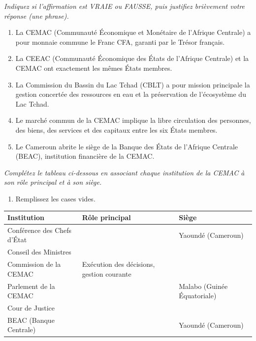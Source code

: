 \documentclass[11pt]{article}
\begin{document}
\begin{exercice}
\emph{Indiquez si l'affirmation est VRAIE ou FAUSSE, puis justifiez brièvement votre réponse (une phrase).}
\begin{enumerate}
    \item La CEMAC (Communauté Économique et Monétaire de l'Afrique Centrale) a pour monnaie commune le Franc CFA, garanti par le Trésor français.
    \item La CEEAC (Communauté Économique des États de l'Afrique Centrale) et la CEMAC ont exactement les mêmes États membres.
    \item La Commission du Bassin du Lac Tchad (CBLT) a pour mission principale la gestion concertée des ressources en eau et la préservation de l'écosystème du Lac Tchad.
    \item Le marché commun de la CEMAC implique la libre circulation des personnes, des biens, des services et des capitaux entre les six États membres.
    \item Le Cameroun abrite le siège de la Banque des États de l'Afrique Centrale (BEAC), institution financière de la CEMAC.
\end{enumerate}
\end{exercice}

\begin{exercice}
\emph{Complétez le tableau ci-dessous en associant chaque institution de la CEMAC à son rôle principal et à son siège.}
\begin{enumerate}
    \item Remplissez les cases vides.
\end{enumerate}

\begin{tabularx}{\linewidth}{|X|X|X|}
\hline
\textbf{Institution} & \textbf{Rôle principal} & \textbf{Siège} \\
\hline
Conférence des Chefs d'État &  & Yaoundé (Cameroun) \\
\hline
Conseil des Ministres &  &  \\
\hline
Commission de la CEMAC & Exécution des décisions, gestion courante &  \\
\hline
Parlement de la CEMAC &  & Malabo (Guinée Équatoriale) \\
\hline
Cour de Justice &  &  \\
\hline
BEAC (Banque Centrale) &  & Yaoundé (Cameroun) \\
\hline
\end{tabularx}
\end{exercice}
\end{document}
